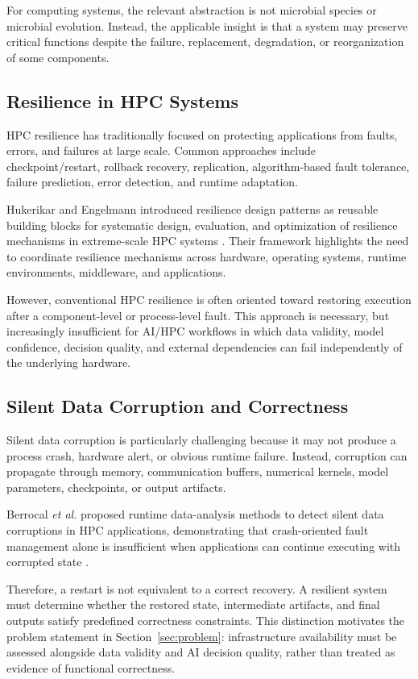 \documentclass[conference]{IEEEtran}
\begin{document}
For computing systems, the relevant abstraction is not microbial species or microbial evolution. Instead, the applicable insight is that a system may preserve critical functions despite the failure, replacement, degradation, or reorganization of some components.

\subsection{Resilience in HPC Systems}

HPC resilience has traditionally focused on protecting applications from faults, errors, and failures at large scale. Common approaches include checkpoint/restart, rollback recovery, replication, algorithm-based fault tolerance, failure prediction, error detection, and runtime adaptation.

Hukerikar and Engelmann introduced resilience design patterns as reusable building blocks for systematic design, evaluation, and optimization of resilience mechanisms in extreme-scale HPC systems \cite{hukerikar2017}. Their framework highlights the need to coordinate resilience mechanisms across hardware, operating systems, runtime environments, middleware, and applications.

However, conventional HPC resilience is often oriented toward restoring execution after a component-level or process-level fault. This approach is necessary, but increasingly insufficient for AI/HPC workflows in which data validity, model confidence, decision quality, and external dependencies can fail independently of the underlying hardware.

\subsection{Silent Data Corruption and Correctness}

Silent data corruption is particularly challenging because it may not produce a process crash, hardware alert, or obvious runtime failure. Instead, corruption can propagate through memory, communication buffers, numerical kernels, model parameters, checkpoints, or output artifacts.

Berrocal \emph{et al.} proposed runtime data-analysis methods to detect silent data corruptions in HPC applications, demonstrating that crash-oriented fault management alone is insufficient when applications can continue executing with corrupted state \cite{berrocal2015}.

Therefore, a restart is not equivalent to a correct recovery. A resilient system must determine whether the restored state, intermediate artifacts, and final outputs satisfy predefined correctness constraints. This distinction motivates the problem statement in Section~\ref{sec:problem}: infrastructure availability must be assessed alongside data validity and AI decision quality, rather than treated as evidence of functional correctness.
\end{document}
